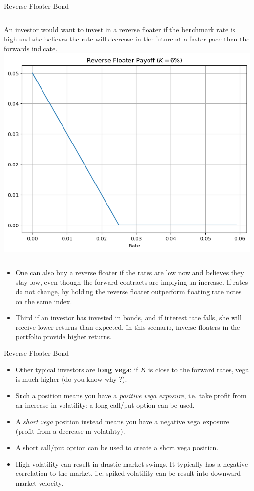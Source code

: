 \documentclass{beamer}
\begin{document}
\begin{frame}{Reverse Floater Bond}
		\begin{columns}
		An investor would want to invest in a reverse floater if the benchmark rate is high and she believes the rate will decrease in the future at a faster pace than the forwards indicate.
				\includegraphics[width=0.8\linewidth]{images/reverse_floater_payoff}
		\end{columns}
	\begin{itemize}
	\item<2-> One can also buy a reverse floater if the rates are low now and believes they stay low, even though the forward contracts are implying an increase. If rates do not change, by holding the reverse floater outperform floating rate notes on the same index.
	\item<3-> Third if an investor has invested in bonds, and if interest rate falls, she will receive lower returns than expected. In this scenario, inverse floaters in the portfolio provide higher returns.
	\end{itemize}
\end{frame}

\begin{frame}{Reverse Floater Bond}
	\begin{itemize}
		\item Other typical investors are \textbf{long vega}: if $K$ is close to the forward rates, vega is much higher (do you know why ?).
		\item Such a position means you have a \emph{positive vega exposure}, i.e. take profit from an increase in volatility: 
		a long call/put option can be used. 
		\item A \emph{short vega} position instead means you have a negative vega exposure (profit from a decrease in volatility). \item A short call/put option can be used to create a short vega position. 
		\item High volatility can result in drastic market swings. It typically has a negative correlation to the market, i.e. spiked volatility can be result into downward market velocity.
	\end{itemize}
\end{frame}
\end{document}
